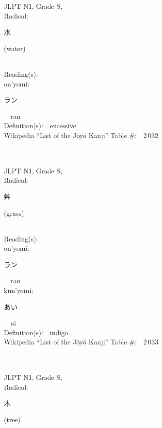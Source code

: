 \begin{multicols}{2}
{JLPT N1, Grade S, \\Radical:\ \ {\begin{CJK}{UTF8}{min} 水 \end{CJK}} (water) } \\
Reading(s):\ \ \\
{\hspace*{1em}}on'yomi:\ \ \\
{\hspace*{2em}}{\begin{CJK}{UTF8}{min} ラン \end{CJK}}\ \ ran\ \ \\
Definition(s):\ \ excessive \\
Wikipedia ``List of the J\=oy\=o Kanji'' Table \#:\ \ 2\,032 \\
\ \ \\
{\fontsize{34pt}{40pt}  }\ \ \\
{JLPT N1, Grade S, \\Radical:\ \ {\begin{CJK}{UTF8}{min} 艸 \end{CJK}} (grass) } \\
Reading(s):\ \ \\
{\hspace*{1em}}on'yomi:\ \ \\
{\hspace*{2em}}{\begin{CJK}{UTF8}{min} ラン \end{CJK}}\ \ ran\ \ \\
{\hspace*{1em}}kun'yomi:\ \ \\
{\hspace*{2em}}{\begin{CJK}{UTF8}{min} あい \end{CJK}}\ \ ai\ \ \\
Definition(s):\ \ indigo \\
Wikipedia ``List of the J\=oy\=o Kanji'' Table \#:\ \ 2\,033 \\
\ \ \\
{\fontsize{34pt}{40pt}  }\ \ \\
{JLPT N1, Grade S, \\Radical:\ \ {\begin{CJK}{UTF8}{min} 木 \end{CJK}} (tree) } \\

\end{multicols}
